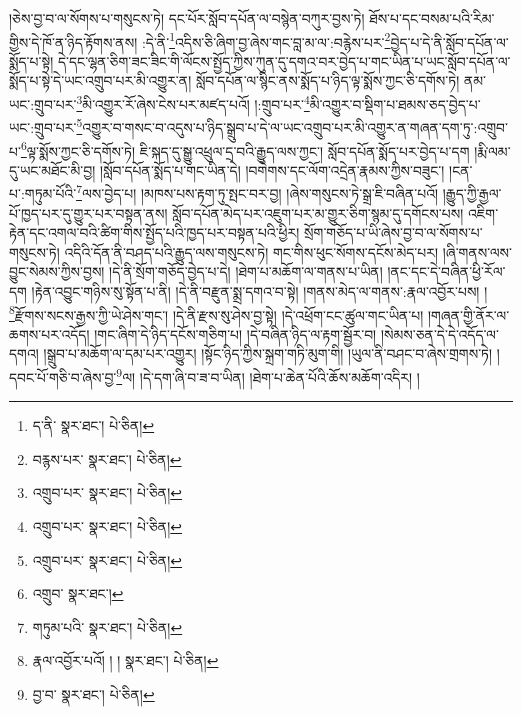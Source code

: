།ཅེས་བྱ་བ་ལ་སོགས་པ་གསུངས་ཏེ། དང་པོར་སློབ་དཔོན་ལ་བསྙེན་བཀུར་བྱས་ཏེ། ཐོས་པ་དང་བསམ་པའི་རིམ་གྱིས་དེ་ཁོ་ན་ཉིད་རྟོགས་ནས། :དེ་ནི་\footnote{ད་ནི་  སྣར་ཐང་།  པེ་ཅིན། }འདིས་ཅི་ཞིག་བྱ་ཞེས་གང་བླ་མ་ལ་:བརྙེས་པར་\footnote{བརྙས་པར་  སྣར་ཐང་།  པེ་ཅིན། }བྱེད་པ་དེ་ནི་སློབ་དཔོན་ལ་སྨོད་པ་སྟེ། དེ་དང་ལྷན་ཅིག་ཟང་ཟིང་གི་ལོངས་སྤྱོད་ཀྱིས་ཀུན་དུ་དགའ་བར་བྱེད་པ་གང་ཡིན་པ་ཡང་སློབ་དཔོན་ལ་སྨོད་པ་སྟེ་དེ་ཡང་འགྲུབ་པར་མི་འགྱུར་ན། སློབ་དཔོན་ལ་སྙིང་ནས་སྨོད་པ་ཉིད་ལྟ་སྨོས་ཀྱང་ཅི་དགོས་ཏེ། ནམ་ཡང་:གྲུབ་པར་\footnote{འགྲུབ་པར་  སྣར་ཐང་།  པེ་ཅིན། }མི་འགྱུར་རོ་ཞེས་ངེས་པར་མཛད་པའོ། །:གྲུབ་པར་\footnote{འགྲུབ་པར་  སྣར་ཐང་།  པེ་ཅིན། }མི་འགྱུར་བ་སྡིག་པ་ཐམས་ཅད་བྱེད་པ་ཡང་:གྲུབ་པར་\footnote{འགྲུབ་པར་  སྣར་ཐང་།  པེ་ཅིན། }འགྱུར་བ་གསང་བ་འདུས་པ་ཉིད་སྒྲུབ་པ་དེ་ལ་ཡང་འགྲུབ་པར་མི་འགྱུར་ན་གཞན་དག་ཏུ་:འགྲུབ་པ་\footnote{འགྲུབ་  སྣར་ཐང་། }ལྟ་སྨོས་ཀྱང་ཅི་དགོས་ཏེ། ཇི་སྐད་དུ་སྒྱུ་འཕྲུལ་དྲ་བའི་རྒྱུད་ལས་ཀྱང་། སློབ་དཔོན་སྨོད་པར་བྱེད་པ་དག །རྨི་ལམ་དུ་ཡང་མཐོང་མི་བྱ། །སློབ་དཔོན་སྨོད་པ་གང་ཡིན་དེ། །བགེགས་དང་ལོག་འདྲེན་རྣམས་ཀྱིས་བཟུང་། །ངན་པ་:གཏུམ་པོའི་\footnote{གཏུམ་པའི་  སྣར་ཐང་།  པེ་ཅིན། }ལས་བྱེད་པ། །མཁས་པས་རྟག་ཏུ་སྤང་བར་བྱ། །ཞེས་གསུངས་ཏེ་སྒྲ་ཇི་བཞིན་པའོ། །རྒྱུད་ཀྱི་རྒྱལ་པོ་ཁྱད་པར་དུ་གྱུར་པར་བསྟན་ནས། སློབ་དཔོན་མེད་པར་འཇུག་པར་མ་གྱུར་ཅིག་སྙམ་དུ་དགོངས་པས། འཇིག་རྟེན་དང་འགལ་བའི་ཚིག་གིས་སྤྱོད་པའི་ཁྱད་པར་བསྟན་པའི་ཕྱིར། སྲོག་གཅོད་པ་ཡི་ཞེས་བྱ་བ་ལ་སོགས་པ་གསུངས་ཏེ། འདིའི་དོན་ནི་བཤད་པའི་རྒྱུད་ལས་གསུངས་ཏེ། གང་གིས་ཕུང་སོགས་དངོས་མེད་པར། །ཞི་གནས་ལས་བྱུང་སེམས་ཀྱིས་བྱས། །དེ་ནི་སྲོག་གཅོད་བྱེད་པ་དེ། །ཐེག་པ་མཆོག་ལ་གནས་པ་ཡིན། །ནང་དང་དེ་བཞིན་ཕྱི་རོལ་དག །རྟེན་འབྱུང་གཉིས་སུ་སྟོན་པ་ནི། །དེ་ནི་བརྫུན་སྨྲ་དགའ་བ་སྟེ། །གནས་མེད་ལ་གནས་:རྣལ་འབྱོར་པས། །\footnote{རྣལ་འབྱོར་པའོ། ། །  སྣར་ཐང་།  པེ་ཅིན། }རྫོགས་སངས་རྒྱས་ཀྱི་ཡེ་ཤེས་གང་། །དེ་ནི་རྫས་སུ་ཤེས་བྱ་སྟེ། །དེ་འཕྲོག་ངང་ཚུལ་གང་ཡིན་པ། །གཞན་གྱི་ནོར་ལ་ཆགས་པར་འདོད། །གང་ཞིག་དེ་ཉིད་དངོས་གཅིག་པ། །དེ་བཞིན་ཉིད་ལ་རྟག་སྦྱོར་བ། །སེམས་ཅན་དེ་དེ་འདོད་ལ་དགའ། །སྒྲུབ་པ་མཆོག་ལ་དམ་པར་འགྱུར། །སྟོང་ཉིད་ཀྱིས་སྐྲག་གཏི་མུག་གི། །ཡུལ་ནི་བཤང་བ་ཞེས་གྲགས་ཏེ། །དབང་པོ་གཅི་བ་ཞེས་བྱ་\footnote{བྱ་བ་  སྣར་ཐང་།  པེ་ཅིན། }ལ། །དེ་དག་ཞི་བ་ཟ་བ་ཡིན། །ཐེག་པ་ཆེན་པོའི་ཆོས་མཆོག་འདིར། །
